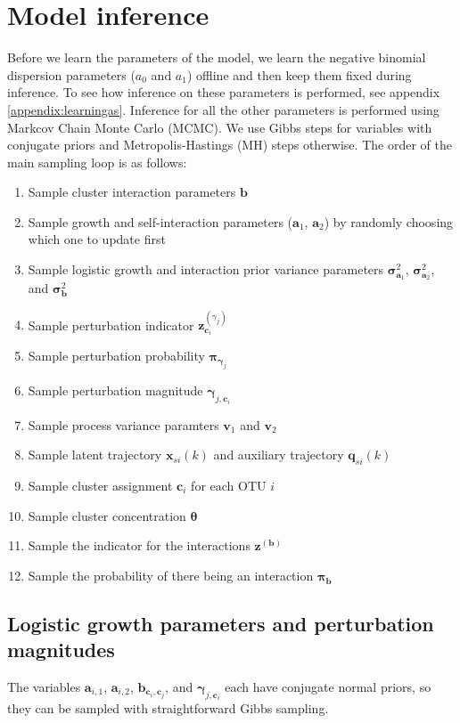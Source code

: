 \documentclass{article}
\renewcommand{\c}{\mathbf{c}}
\newcommand{\concc}{\mathbf{\theta}}
\renewcommand{\a}[2]{\mathbf{a}_{#1,#2}}
\renewcommand{\aa}[1]{\mathbf{a}_{#1}}
\newcommand{\vara}[1]{\mathbf{\sigma}^2_{\mathbf{a}_#1}}
\newcommand{\bc}[2]{\mathbf{b}_{\c_{#1},\c_{#2}}}
\renewcommand{\b}{\mathbf{b}}
\newcommand{\zb}{\mathbf{z}^{(\mathbf{b})}}
\newcommand{\probb}{\mathbf{\pi}_{\mathbf{b}}}
\newcommand{\varb}{\mathbf{\sigma}^2_{\mathbf{b}}}
\newcommand{\pert}{\mathbf{\gamma}_j}
\newcommand{\pertc}[1]{\mathbf{\gamma}_{j,\c_{#1}}}
\newcommand{\zpertc}[1]{\mathbf{z}^{(\gamma_j)}_{\c_{#1}}}
\newcommand{\probpert}{\mathbf{\pi}_{\pert}}
\newcommand{\x}[2]{\mathbf{x}_{#2}(#1)}
\newcommand{\q}[2]{\mathbf{q}_{#2}(#1)}
\renewcommand{\v}[1]{\mathbf{v}_{#1}}
\begin{document}
\section{Model inference}
\label{section:model inference}
Before we learn the parameters of the model, we learn the negative binomial dispersion parameters ($a_0$ and $a_1$) offline and then keep them fixed during inference. To see how inference on these parameters is performed, see appendix \ref{appendix:learningas}. Inference for all the other parameters is performed using Markcov Chain Monte Carlo (MCMC). We use Gibbs steps for variables with conjugate priors and Metropolis-Hastings (MH) steps otherwise. The order of the main sampling loop is as follows:
\begin{enumerate}
  \item Sample cluster interaction parameters $\b$
  \item Sample growth and self-interaction parameters ($\aa{1}$, $\aa{2}$) by randomly choosing which one to update first
  \item Sample logistic growth and interaction prior variance parameters $\vara{1}$, $\vara{2}$, and $\varb$
  \item Sample perturbation indicator $\zpertc{i}$
  \item Sample perturbation probability $\probpert$
  \item Sample perturbation magnitude $\pertc{i}$
  \item Sample process variance paramters $\v{1}$ and $\v{2}$
  \item Sample latent trajectory $\x{k}{si}$ and auxiliary trajectory $\q{k}{si}$
  \item Sample cluster assignment $\c_i$ for each OTU $i$
  \item Sample cluster concentration $\concc$
  \item Sample the indicator for the interactions $\zb$
  \item Sample the probability of there being an interaction $\probb$


\end{enumerate}

\subsection{Logistic growth parameters and perturbation magnitudes}
The variables $\a{i}{1}$, $\a{i}{2}$, $\bc{i}{j}$, and $\pertc{i}$ each have conjugate normal priors, so they can be sampled with straightforward Gibbs sampling.
\end{document}
